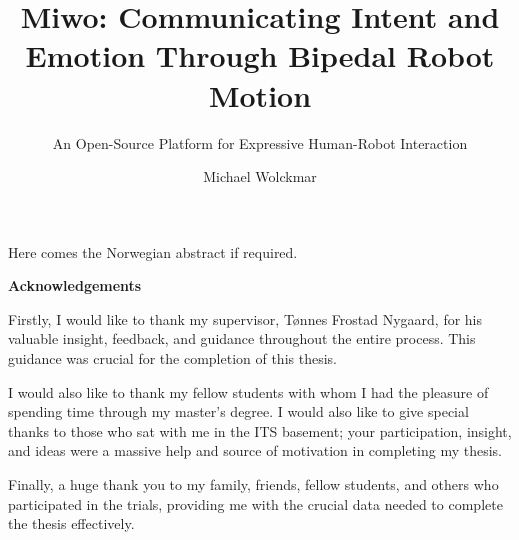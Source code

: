 \documentclass[UKenglish,font=times]{Template_Files/uiomasterthesis}
\title{Miwo: Communicating Intent and Emotion Through Bipedal Robot Motion}
\subtitle{An Open-Source Platform for Expressive Human-Robot Interaction}
\author{Michael Wolckmar}
\begin{document}
\uiomasterfp[
  dept={Department of Informatics},
  program={Cybernetics and Autonomous Systems},
  supervisor={Tønnes Nygaard},
  long]

\frontmatter{}

\begin{abstract}
  
\end{abstract}

\begin{xabstract}[Sammendrag]
  Here comes the Norwegian abstract if required.
\end{xabstract}

\tableofcontents{}
\listoffigures{}
\listoftables{}

\begin{preface}
\textbf{Acknowledgements}

Firstly, I would like to thank my supervisor, Tønnes Frostad Nygaard, for his valuable insight, feedback, and guidance throughout the entire process. This guidance was crucial for the completion of this thesis.

I would also like to thank my fellow students with whom I had the pleasure of spending time through my master's degree. I would also like to give special thanks to those who sat with me in the ITS basement; your participation, insight, and ideas were a massive help and source of motivation in completing my thesis.

Finally, a huge thank you to my family, friends, fellow students, and others who participated in the trials, providing me with the crucial data needed to complete the thesis effectively.
\end{preface}


\mainmatter{}











\backmatter{}
\printbibliography{}

\appendix
\end{document}
